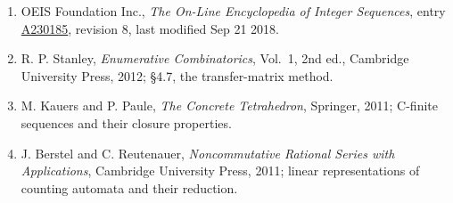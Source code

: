 \documentclass[11pt]{article}
\theoremstyle{definition}
\begin{document}
\begin{enumerate}

\item OEIS Foundation Inc., \emph{The On-Line Encyclopedia of Integer Sequences}, entry \href{https://oeis.org/A230185}{A230185}, revision 8, last modified Sep 21 2018.

\item R. P. Stanley, \emph{Enumerative Combinatorics}, Vol.~1, 2nd ed., Cambridge University Press, 2012; \S4.7, the transfer-matrix method.

\item M. Kauers and P. Paule, \emph{The Concrete Tetrahedron}, Springer, 2011; C-finite sequences and their closure properties.

\item J. Berstel and C. Reutenauer, \emph{Noncommutative Rational Series with Applications}, Cambridge University Press, 2011; linear representations of counting automata and their reduction.

\end{enumerate}
\end{document}
